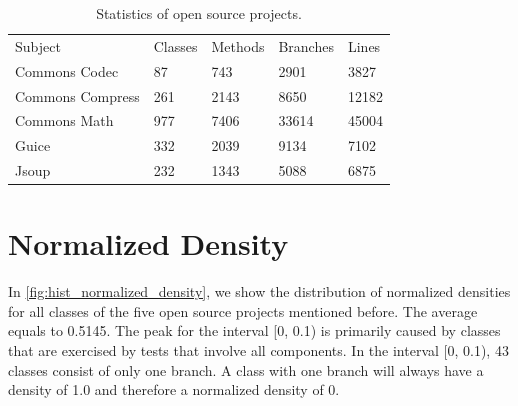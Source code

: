 \documentclass[twoside,a4paper,11pt]{memoir}
\begin{document}
\begin{table}[]
\centering
\caption{Statistics of open source projects.}%
\label{tab:project_statistics}
\begin{tabular}{lllll}
    \toprule
    Subject          & Classes & Methods & Branches & Lines \\
    \rowcolor{Gray} 
    Commons Codec    & 87      & 743     & 2901     & 3827  \\
    Commons Compress & 261     & 2143    & 8650     & 12182 \\
    \rowcolor{Gray} 
    Commons Math     & 977     & 7406    & 33614    & 45004 \\
    Guice            & 332     & 2039    & 9134     & 7102  \\
    \rowcolor{Gray} 
    Jsoup            & 232     & 1343    & 5088     & 6875 \\
    \bottomrule
\end{tabular}
\end{table}

\section{Normalized Density}

In \autoref{fig:hist_normalized_density}, we show the distribution of normalized densities for all classes of the five open source projects mentioned before.
The average equals to 0.5145.
The peak for the interval [0, 0.1) is primarily caused by classes that are exercised by tests that involve all components.
In the interval [0, 0.1), 43 classes consist of only one branch.
A class with one branch will always have a density of 1.0 and therefore a normalized density of 0.
\end{document}
